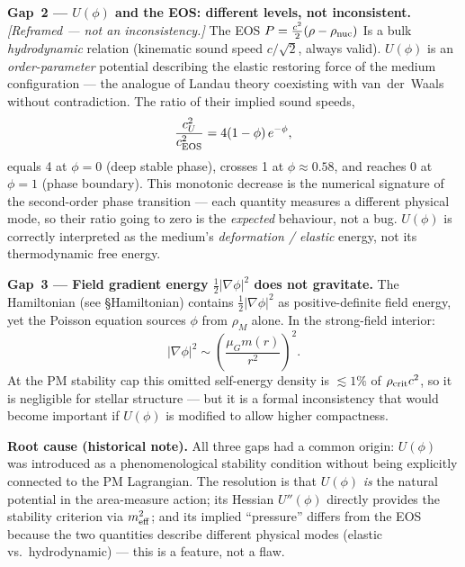 \documentclass[10pt,twocolumn]{article}
\begin{document}
\textbf{Gap~2 — $U(\phi)$ and the EOS: different levels, not inconsistent.}
\emph{[Reframed — not an inconsistency.]}  The EOS $P=\tfrac{c^2}{2}(\rho-\rho_{\rm nuc})$
Is a bulk \emph{hydrodynamic} relation (kinematic sound speed $c/\sqrt{2}$,
always valid).  $U(\phi)$ is an \emph{order-parameter} potential describing
the elastic restoring force of the medium configuration — the analogue
of Landau theory coexisting with van~der~Waals without contradiction.
The ratio of their implied sound speeds,
\[
  \frac{c^2_U}{c^2_{\rm EOS}} = 4(1-\phi)\,e^{-\phi},
\]
equals 4 at $\phi=0$ (deep stable phase), crosses 1 at $\phi\approx 0.58$,
and reaches 0 at $\phi=1$ (phase boundary).  This monotonic decrease is the
numerical signature of the second-order phase transition — each quantity
measures a different physical mode, so their ratio going to zero is the
\emph{expected} behaviour, not a bug.  $U(\phi)$ is correctly interpreted
as the medium's \emph{deformation / elastic} energy, not its thermodynamic
free energy.

\textbf{Gap~3 — Field gradient energy $\tfrac{1}{2}|\nabla\phi|^2$
does not gravitate.}
The Hamiltonian (see §Hamiltonian) contains $\tfrac{1}{2}|\nabla\phi|^2$
as positive-definite field energy, yet the Poisson equation sources
$\phi$ from $\rho_M$ alone.  In the strong-field interior:
\[
  |\nabla\phi|^2 \sim \left(\frac{\mu_G m(r)}{r^2}\right)^2.
\]
At the PM stability cap this omitted self-energy density is
$\lesssim 1\%$ of $\rho_{\rm crit}c^2$, so it is negligible for
stellar structure — but it is a formal inconsistency that would
become important if $U(\phi)$ is modified to allow higher compactness.

\textbf{Root cause (historical note).}  All three gaps had a common origin:
$U(\phi)$ was introduced as a phenomenological stability condition without
being explicitly connected to the PM Lagrangian.  The resolution is that
$U(\phi)$ \emph{is} the natural potential in the area-measure action; its
Hessian $U''(\phi)$ directly provides the stability criterion via $m^2_{\rm eff}$;
and its implied ``pressure'' differs from the EOS because the two quantities
describe different physical modes (elastic vs.\ hydrodynamic) — this is a
feature, not a flaw.
\end{document}
